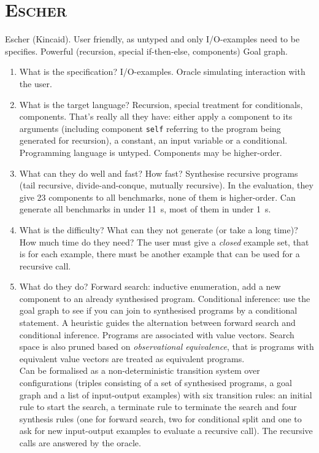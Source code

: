 \section{\mdseries\textsc{Escher}}
Escher (Kincaid). User friendly, as untyped and only I/O-examples need to be specifies. Powerful (recursion, special if-then-else, components) Goal graph.
\begin{enumerate}
\item What is the specification?
I/O-examples. Oracle simulating interaction with the user.
\item What is the target language?
Recursion, special treatment for conditionals, components. That's really all they have: either apply a component to its arguments (including component \lstinline?self? referring to the program being generated for recursion), a constant, an input variable or a conditional. Programming language is untyped. Components may be higher-order.
\item What can they do well and fast? How fast?
Synthesise recursive programs (tail recursive, divide-and-conque, mutually recursive). In the evaluation, they give 23 components to all benchmarks, none of them is higher-order. Can generate all benchmarks in under 11~s, most of them in under 1~s.
\item What is the difficulty? What can they not generate (or take a long time)? How much time do they need?
The user must give a \emph{closed} example set, that is for each example, there must be another example that can be used for a recursive call.
\item What do they do?
Forward search: inductive enumeration, add a new component to an already synthesised program.
Conditional inference: use the goal graph to see if you can join to synthesised programs by a conditional statement.
A heuristic guides the alternation between forward search and conditional inference.
Programs are associated with value vectors. Search space is also pruned based on \emph{observational equivalence}, that is programs with equivalent value vectors are treated as equivalent programs.\\
Can be formalised as a non-deterministic transition system over configurations (triples consisting of a set of synthesised programs, a goal graph and a list of input-output examples) with six transition rules: an initial rule to start the search, a terminate rule to terminate the search and four synthesis rules (one for forward search, two for conditional split and one to ask for new input-output examples to evaluate a recursive call). The recursive calls are answered by the oracle.\\

\end{enumerate}
